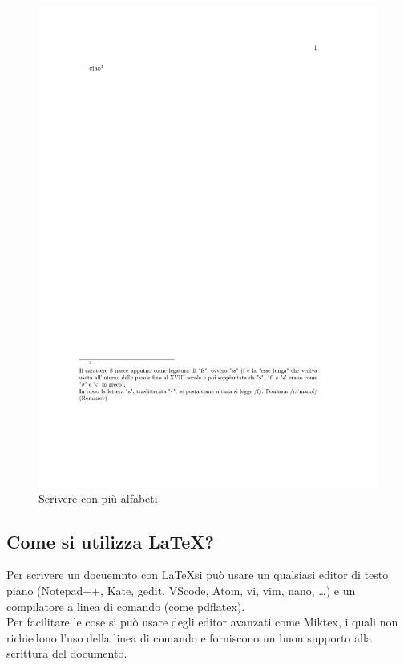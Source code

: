 \begin{figure}[!h]\centering
  \includegraphics[width=\textwidth,page=1]{img/alfabeti}
  \caption{Scrivere con più alfabeti}
\end{figure}
\subsection{Come si utilizza \LaTeX?}
  Per scrivere un docuemnto con \LaTeX si può usare un qualsiasi editor di testo piano (Notepad++, Kate, gedit, VScode, Atom, vi, vim, nano, \dots) e un compilatore a linea di comando (come pdflatex).\\
  Per facilitare le cose si può usare degli editor avanzati come Miktex, i quali non richiedono l'uso della linea di comando e forniscono un buon supporto alla scrittura del documento.
